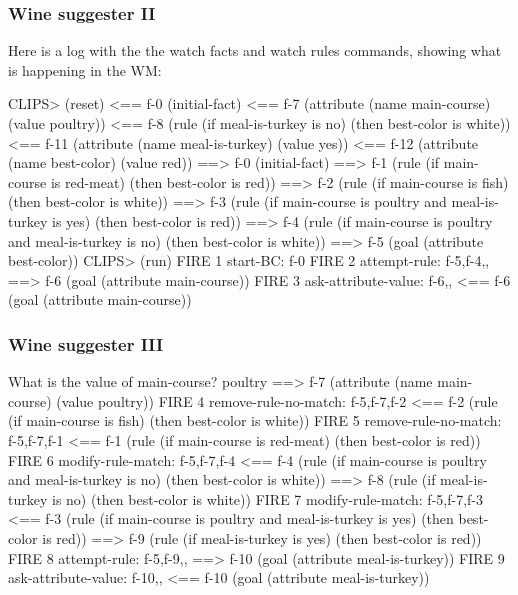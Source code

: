 \documentclass[xcolor={usenames,dvipsnames,svgnames}, compress]{beamer}
\begin{document}
\begin{frame}[fragile]
  \frametitle{Wine suggester II}
  Here is a log with the the \textsf{watch facts} and \textsf{watch
    rules} commands, showing what is happening in the WM:
  \begin{clips-code}[basicstyle=\tiny]
    CLIPS> (reset)
    <== f-0     (initial-fact)
    <== f-7     (attribute (name main-course) (value poultry))
    <== f-8     (rule (if meal-is-turkey is no) (then best-color is white))
    <== f-11    (attribute (name meal-is-turkey) (value yes))
    <== f-12    (attribute (name best-color) (value red))
    ==> f-0     (initial-fact)
    ==> f-1     (rule (if main-course is red-meat) (then best-color is red))
    ==> f-2     (rule (if main-course is fish) (then best-color is white))
    ==> f-3     (rule (if main-course is poultry and meal-is-turkey is yes) (then best-color is red))
    ==> f-4     (rule (if main-course is poultry and meal-is-turkey is no) (then best-color is white))
    ==> f-5     (goal (attribute best-color))
    CLIPS> (run)
    FIRE    1 start-BC: f-0
    FIRE    2 attempt-rule: f-5,f-4,,
    ==> f-6     (goal (attribute main-course))
    FIRE    3 ask-attribute-value: f-6,,
    <== f-6     (goal (attribute main-course))
  \end{clips-code}
\end{frame}

\begin{frame}[fragile]
  \frametitle{Wine suggester III}
  \begin{clips-code}[basicstyle=\tiny,firstnumber=19]
    What is the value of main-course? poultry
    ==> f-7     (attribute (name main-course) (value poultry))
    FIRE    4 remove-rule-no-match: f-5,f-7,f-2
    <== f-2     (rule (if main-course is fish) (then best-color is white))
    FIRE    5 remove-rule-no-match: f-5,f-7,f-1
    <== f-1     (rule (if main-course is red-meat) (then best-color is red))
    FIRE    6 modify-rule-match: f-5,f-7,f-4
    <== f-4     (rule (if main-course is poultry and meal-is-turkey is no) (then best-color is white))
    ==> f-8     (rule (if meal-is-turkey is no) (then best-color is white))
    FIRE    7 modify-rule-match: f-5,f-7,f-3
    <== f-3     (rule (if main-course is poultry and meal-is-turkey is yes) (then best-color is red))
    ==> f-9     (rule (if meal-is-turkey is yes) (then best-color is red))
    FIRE    8 attempt-rule: f-5,f-9,,
    ==> f-10    (goal (attribute meal-is-turkey))
    FIRE    9 ask-attribute-value: f-10,,
    <== f-10    (goal (attribute meal-is-turkey))
  \end{clips-code}
\end{frame}
\end{document}
